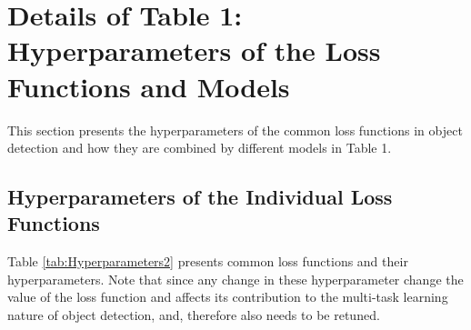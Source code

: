 \documentclass{article}
\begin{document}
 \section{Details of Table 1: Hyperparameters of the Loss Functions and Models}
\label{sec:Htperparameters}
This section presents the hyperparameters of the common loss functions in object detection and how they are combined by different models in Table 1.

\subsection{Hyperparameters of the Individual Loss Functions}
Table \ref{tab:Hyperparameters2} presents common loss functions and their hyperparameters. Note that since any change in these hyperparameter change the value of the loss function and affects its contribution to the multi-task learning nature of object detection, and, therefore  also needs to be retuned. 
\end{document}
